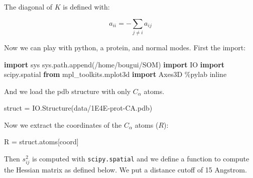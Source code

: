 \documentclass[
]{article}
\newenvironment{Shaded}{}{}
\newcommand{\ImportTok}[1]{\textcolor[rgb]{0.00,0.50,0.00}{\textbf{#1}}}
\newcommand{\NormalTok}[1]{#1}
\newcommand{\OperatorTok}[1]{\textcolor[rgb]{0.40,0.40,0.40}{#1}}
\newcommand{\StringTok}[1]{\textcolor[rgb]{0.25,0.44,0.63}{#1}}
\begin{document}
The diagonal of \(K\) is defined with:

\[a_{ii} = -\sum_{j \neq i} a_{ij}\]

Now we can play with python, a protein, and normal modes. First the
import:

\begin{Shaded}
\begin{Highlighting}[]
\ImportTok{import}\NormalTok{ sys}
\NormalTok{sys.path.append(}\StringTok{\textquotesingle{}/home/bougui/SOM\textquotesingle{}}\NormalTok{)}
\ImportTok{import}\NormalTok{ IO}
\ImportTok{import}\NormalTok{ scipy.spatial}
\ImportTok{from}\NormalTok{ mpl\_toolkits.mplot3d }\ImportTok{import}\NormalTok{ Axes3D}
\OperatorTok{\%}\NormalTok{pylab inline}
\end{Highlighting}
\end{Shaded}

And we load the pdb structure with only \(C_\alpha\) atoms.

\begin{Shaded}
\begin{Highlighting}[]
\NormalTok{struct }\OperatorTok{=}\NormalTok{ IO.Structure(}\StringTok{\textquotesingle{}data/1E4E{-}prot{-}CA.pdb\textquotesingle{}}\NormalTok{)}
\end{Highlighting}
\end{Shaded}

Now we extract the coordinates of the \(C_\alpha\) atoms (\(R\)):

\begin{Shaded}
\begin{Highlighting}[]
\NormalTok{R }\OperatorTok{=}\NormalTok{ struct.atoms[}\StringTok{\textquotesingle{}coord\textquotesingle{}}\NormalTok{]}
\end{Highlighting}
\end{Shaded}

Then \(s_{ij}^2\) is computed with \texttt{scipy.spatial} and we define
a function to compute the Hessian matrix as defined below. We put a
distance cutoff of 15 Angstrom.
\end{document}
